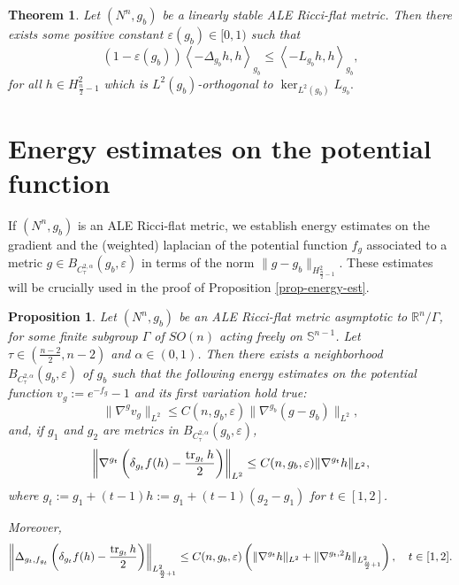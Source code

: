 \documentclass[a4paper,11pt,reqno]{amsart}
\newtheorem{prop}[defn]{Proposition}
\newtheorem{theo}[defn]{Theorem}
\def\RR{\mathbb{R}}
\def\tr{\mathop{\rm tr}\nolimits}
\def\tr{\mathop{\rm tr}\nolimits}
\numberwithin{equation}{section}
\begin{document}
	\begin{theo}\label{theo-der-kro}
		Let $(N^n,g_b)$ be a linearly stable ALE Ricci-flat metric. Then there exists some positive constant $\varepsilon(g_b)\in[0,1)$ such that 
		\begin{equation*}
		(1-\varepsilon(g_b))\left<-\Delta_{g_b}h,h\right>_{g_b}\leq \left<-L_{g_b}h,h\right>_{g_b}, 
		\end{equation*}
		for all $h\in H^2_{\frac{n}{2}-1}$ which is $L^2(g_b)$-orthogonal to $\ker_{L^2(g_b)}L_{g_b}.$
	\end{theo}
	
	
	\section{Energy estimates on the potential function}\label{sec-ene-est-pot-fct}
	If $(N^n,g_b)$ is an ALE Ricci-flat metric, we establish energy estimates on the gradient and the (weighted) laplacian of the potential function $f_g$ associated to a metric $g\in B_{C^{2,\alpha}_{\tau}}(g_b,\varepsilon)$ in terms of the norm $\|g-g_b\|_{H^2_{\frac{n}{2}-1}}$. These estimates will be crucially used in the proof of Proposition \ref{prop-energy-est}.
	
	\begin{prop}\label{prop-ene-pot-fct}
		Let $(N^n,g_b)$ be an ALE Ricci-flat metric asymptotic to $\RR^n\slash\Gamma$, for some finite subgroup $\Gamma$ of $SO(n)$ acting freely on $\mathbb{S}^{n-1}$. Let $\tau\in\left(\frac{n-2}{2},n-2\right)$ and $\alpha\in (0,1)$. Then there exists a neighborhood $B_{C^{2,\alpha}_{\tau}}(g_b,\varepsilon)$ of $g_b$ such that the following energy estimates on the potential function $v_g:=e^{-f_g}-1$ and its first variation hold true:
		\begin{equation}
		\|\nabla^gv_g\|_{L^2}\leq C(n,g_b,\varepsilon)\|\nabla^{g_b}(g-g_b)\|_{L^2}\label{grad-est-int-ene},
		\end{equation}
		and, if $g_1$ and $g_2$ are metrics in $B_{C^{2,\alpha}_{\tau}}(g_b,\varepsilon)$,
		\begin{equation}
		\left\|\nabla^{g_t}\left(\delta_{g_t}f(h)-\frac{\tr_{g_t}h}{2}\right)\right\|_{L^2}\leq C(n,g_b,\varepsilon)\|\nabla^{g_t}h\|_{L^2},\label{est-grad-first-der-pot-fct-ene}
		\end{equation}
		where $g_t:=g_1+(t-1)h:=g_1+(t-1)(g_2-g_1)$ for $t\in[1,2]$.
		
		Moreover,
		\begin{equation}\label{first-var-pot-fct-ell-equ-gal-case-prop}
		\left\|\Delta_{g_t,f_{g_t}}\left(\delta_{g_t}f(h)-\frac{\tr_{g_t}h}{2}\right)\right\|_{L^2_{\frac{n}{2}+1}}\leq C(n,g_b,\varepsilon)\left(\|\nabla^{g_t}h\|_{L^2}+\|\nabla^{g_t,2}h\|_{L^2_{\frac{n}{2}+1}}\right),\quad t\in[1,2].
		\end{equation}
		
		
	\end{prop}
	
\end{document}
